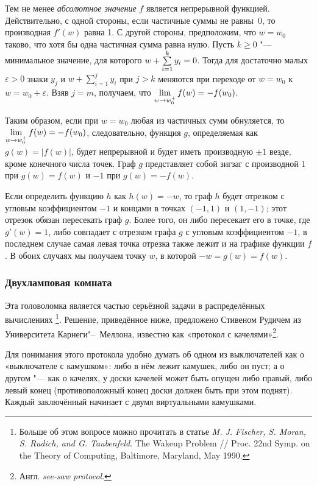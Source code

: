 \documentclass[twoside]{book}
\begin{document}
Тем не менее \emph{абсолютное значение} $f$ является непрерывной функцией.
Действительно, с одной стороны, если частичные суммы не равны~$0$, то производная $f'(w)$ равна 1.
С другой стороны, предположим, что $w=w_0$ таково, что хотя бы одна частичная сумма равна нулю.
Пусть $k\ge0$ "--- минимальное значение, для которого $w+\sum\limits_{i=1}^{k}y_i\z=0$.
Тогда для достаточно малых $\varepsilon>0$
знаки  $y_j$ и $w+\sum\limits_{i=1}^{j}y_i$ при $j>k$ меняются при переходе от $w=w_0$ к $w=w_0+\varepsilon$.
Взяв $j = m$, получаем, что $\lim\limits_{w\to w_0^+}f(w)\z=-f(w_0)$.

Таким образом, если при $w=w_0$ любая из частичных сумм обнуляется, то $\lim\limits_{w\to w_0^+}f(w)\z=-f(w_0)$, следовательно, функция $g$, определяемая как $g(w) =|f(w)|$, будет непрерывной и будет иметь производную $\pm1$ везде, кроме конечного числа точек.
Граф $g$ представляет собой зигзаг с производной $1$ при $g(w)=f(w)$ и $-1$ при $g(w)=-f(w)$.

Если определить функцию $h$ как $h (w) = -w$, то граф $h$ будет отрезком с угловым коэффициентом $-1$ и концами в точках $(-1,1)$ и $(1,-1)$;
этот отрезок обязан пересекать граф $g$.
Более того, он либо пересекает его в точке, где $g'(w) = 1$, либо совпадает с отрезком графа $g$ с угловым коэффициентом $-1$, в последнем случае самая левая точка отрезка также лежит и на графике функции $f$.
В обоих случаях мы получаем точку $w$, в которой $-w = g (w) = f (w)$.
\heart

\subsubsection*{Двухламповая комната}

Эта головоломка является частью серьёзной задачи в распределённых вычислениях%
\footnote{Больше об этом вопросе можно прочитать в статье \emph{M. J. Fischer, S. Moran, S. Rudich, and G. Taubenfeld}. The Wakeup Problem /\!/ {Proc. 22nd Symp. on the Theory of Computing}, Baltimore, Maryland, May 1990.}.
Решение, приведённое ниже, предложено Стивеном Рудичем из Университета Карнеги"--~Меллона, известно как «протокол с качелями»\footnote{Англ. \emph{see-saw protocol}.}.

\medskip

Для понимания этого протокола удобно думать об одном из выключателей как о «выключателе с камушком»: либо в нём лежит камушек, либо он пуст; а о другом "--- как о качелях, у доски качелей может быть опущен либо правый, либо  левый конец (противоположный конец доски должен быть при этом поднят).
Каждый заключённый начинает с двумя виртуальными камушками.
\end{document}
